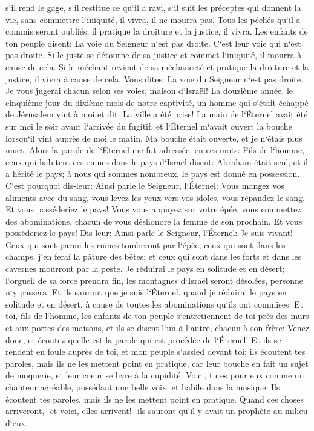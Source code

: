 \verse s`il rend le gage, s`il restitue ce qu`il a ravi, s`il suit les préceptes qui donnent la vie, sans commettre l`iniquité, il vivra, il ne mourra pas. 
\verse Tous les péchés qu`il a commis seront oubliés; il pratique la droiture et la justice, il vivra. 
\verse Les enfants de ton peuple disent: La voie du Seigneur n`est pas droite. C`est leur voie qui n`est pas droite. 
\verse Si le juste se détourne de sa justice et commet l`iniquité, il mourra à cause de cela. 
\verse Si le méchant revient de sa méchanceté et pratique la droiture et la justice, il vivra à cause de cela. 
\verse Vous dites: La voie du Seigneur n`est pas droite. Je vous jugerai chacun selon ses voies, maison d`Israël! 
\verse La douzième année, le cinquième jour du dixième mois de notre captivité, un homme qui s`était échappé de Jérusalem vint à moi et dit: La ville a été prise! 
\verse La main de l`Éternel avait été sur moi le soir avant l`arrivée du fugitif, et l`Éternel m`avait ouvert la bouche lorsqu`il vint auprès de moi le matin. Ma bouche était ouverte, et je n`étais plus muet. 
\verse Alors la parole de l`Éternel me fut adressée, en ces mots: 
\verse Fils de l`homme, ceux qui habitent ces ruines dans le pays d`Israël disent: Abraham était seul, et il a hérité le pays; à nous qui sommes nombreux, le pays est donné en possession. 
\verse C`est pourquoi dis-leur: Ainsi parle le Seigneur, l`Éternel: Vous mangez vos aliments avec du sang, vous levez les yeux vers vos idoles, vous répandez le sang. Et vous posséderiez le pays! 
\verse Vous vous appuyez sur votre épée, vous commettez des abominations, chacun de vous déshonore la femme de son prochain. Et vous posséderiez le pays! 
\verse Dis-leur: Ainsi parle le Seigneur, l`Éternel: Je suis vivant! Ceux qui sont parmi les ruines tomberont par l`épée; ceux qui sont dans les champs, j`en ferai la pâture des bêtes; et ceux qui sont dans les forts et dans les cavernes mourront par la peste. 
\verse Je réduirai le pays en solitude et en désert; l`orgueil de sa force prendra fin, les montagnes d`Israël seront désolées, personne n`y passera. 
\verse Et ils sauront que je suis l`Éternel, quand je réduirai le pays en solitude et en désert, à cause de toutes les abominations qu`ils ont commises. 
\verse Et toi, fils de l`homme, les enfants de ton peuple s`entretiennent de toi près des murs et aux portes des maisons, et ils se disent l`un à l`autre, chacun à son frère: Venez donc, et écoutez quelle est la parole qui est procédée de l`Éternel! 
\verse Et ils se rendent en foule auprès de toi, et mon peuple s`assied devant toi; ils écoutent tes paroles, mais ils ne les mettent point en pratique, car leur bouche en fait un sujet de moquerie, et leur coeur se livre à la cupidité. 
\verse Voici, tu es pour eux comme un chanteur agréable, possédant une belle voix, et habile dans la musique. Ils écoutent tes paroles, mais ils ne les mettent point en pratique. 
\verse Quand ces choses arriveront, -et voici, elles arrivent! -ils sauront qu`il y avait un prophète au milieu d`eux. 

